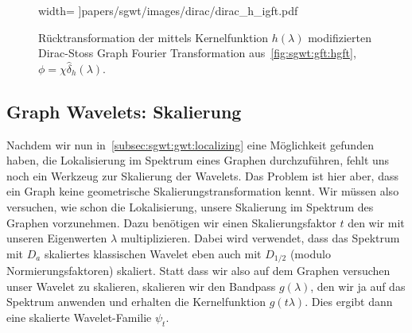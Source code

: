 \begin{figure}
\begin{minipage}[t]{0.49\textwidth}
        width=\textwidth
        ]{papers/sgwt/images/dirac/dirac_h_igft.pdf}
        \vspace{-0pt}
        \caption{R\"ucktransformation der mittels Kernelfunktion $h(\lambda)$ 
        modifizierten Dirac-Stoss Graph Fourier Transformation
        aus~\cref{fig:sgwt:gft:hgft}, $\phi = \chi\hat{\delta}_h(\lambda)$.
        \label{fig:sgwt:gft:ihgft}}
    \end{minipage}
\end{figure}

\subsection{Graph Wavelets: Skalierung\label{subsec:sgwt:gwt:scaling}}

Nachdem wir nun in~\cref{subsec:sgwt:gwt:localizing} eine M\"oglichkeit 
gefunden haben, die Lokalisierung im Spektrum eines Graphen durchzuf\"uhren, 
fehlt uns noch ein Werkzeug zur Skalierung der Wavelets. Das Problem ist hier 
aber, dass ein Graph keine geometrische Skalierungstransformation kennt. Wir 
m\"ussen also versuchen, wie schon die Lokalisierung, unsere 
Skalierung im Spektrum des Graphen vorzunehmen. Dazu ben\"otigen wir einen 
Skalierungsfaktor $t$ den wir mit unseren Eigenwerten $\lambda$ multiplizieren.
Dabei wird verwendet, dass das Spektrum mit $D_a$ skaliertes klassischen 
Wavelet eben auch mit $D_{1/2}$ (modulo Normierungsfaktoren) skaliert. Statt 
dass wir also auf dem Graphen versuchen unser Wavelet zu skalieren, skalieren 
wir den Bandpass $g(\lambda)$, den wir ja auf das Spektrum anwenden und 
erhalten die Kernelfunktion $g(t\lambda)$. Dies ergibt dann eine skalierte 
Wavelet-Familie $\psi_t$.

